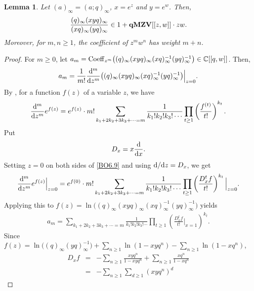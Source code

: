 \documentclass[12pt, reqno]{amsart}
\newtheorem{lemma}[theorem]{Lemma}
\theoremstyle{definition}
\theoremstyle{remark}
\numberwithin{equation}{section}
\newcommand{\C}{ \mathbb C }
\newcommand{\Coe}{ {\rm Coeff} }
\newcommand{\qMZV}{ {\bf qMZV} }
\numberwithin{equation}{section}
\begin{document}
\begin{lemma}   \label{AAA06250955am}
Let $(a)_\infty = (a; q)_\infty$, $x = e^{z}$ and $y = e^{w}$. Then,
$$
\frac{(q)_\infty (xyq)_\infty}{(xq)_\infty (yq)_\infty} \in 1 
+ \qMZV[[z, w]] \cdot zw.
$$
Moreover, for $m, n \ge 1$, the coefficient of $z^m w^n$ has weight $m+n$.
\end{lemma}
\begin{proof}
For $m \ge 0$, let $a_{m} = \Coe_{z^m} 
\big ((q)_\infty (xyq)_\infty (xq)_\infty^{-1} (yq)_\infty^{-1} 
\big ) \in \C[[q, w]]$. Then,
$$
  a_{m}
= \frac{1}{m!} \frac{{\rm d}^m}{{\rm d}z^m}
  \big ((q)_\infty (xyq)_\infty (xq)_\infty^{-1} (yq)_\infty^{-1} \big )
  \Big |_{z=0}.
$$
By \cite[(6.9)]{BO}, for a function $f(z)$ of a variable $z$, we have
\begin{eqnarray}  \label{BO6.9}
  \frac{{\rm d}^m}{{\rm d}z^m} e^{f(z)} 
= e^{f(z)} \cdot m! \sum_{k_1+2k_2+3k_3+\cdots = m}
  \frac{1}{k_1! k_2! k_3! \cdots} \prod_{t \ge 1}
  \left (\frac{f^{(t)}}{t!} \right )^{k_t}. 
\end{eqnarray} 
Put 
\begin{eqnarray}  \label{Dx}
D_x = x \frac{\rm d}{{\rm d}x}.
\end{eqnarray} 
Setting $z = 0$ on both sides of \eqref{BO6.9} and 
using ${\rm d}/{\rm d}z = D_x$, we get
\begin{eqnarray}  \label{BO6.9z=0}
  \frac{{\rm d}^m}{{\rm d}z^m} e^{f(z)} \Big |_{z=0}
= e^{f(0)} \cdot m! \sum_{k_1+2k_2+3k_3+\cdots = m}
  \frac{1}{k_1! k_2! k_3! \cdots} \prod_{t \ge 1}
  \left (\frac{D_x^t f}{t!} \right )^{k_t} \Big |_{z=0}. 
\end{eqnarray}
Applying this to $f(z) = \ln\big ((q)_\infty (xyq)_\infty 
(xq)_\infty^{-1} (yq)_\infty^{-1} \big )$ yields
\begin{eqnarray}  \label{AAA06250955am.1}
  a_{m}
= \sum_{k_1+2k_2+3k_3+\cdots = m}
  \frac{1}{k_1! k_2! k_3! \cdots} \prod_{t \ge 1}
  \left (\frac{D_x^t f}{t!} \Big |_{x=1}\right )^{k_t}. 
\end{eqnarray} 
Since $f(z) = 
\ln\big ((q)_\infty (yq)_\infty^{-1} \big ) + \sum_{n \ge 1} \ln (1-xyq^n)
- \sum_{n \ge 1} \ln (1-xq^n)$,
\begin{eqnarray*} 
   D_xf  
&=&-\sum_{n \ge 1} \frac{xyq^n}{1-xyq^n} + \sum_{n \ge 1} \frac{xq^n}{1-xq^n} \\
&=&-\sum_{n \ge 1} \sum_{d \ge 1} (xyq^n)^d 

\end{eqnarray*}
\end{proof}
\end{document}
